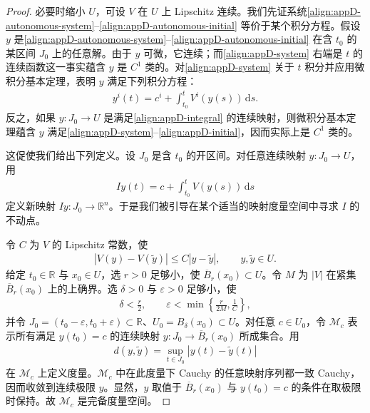 \documentclass[../../main.tex]{subfiles}
\begin{document}
\begin{proof}
必要时缩小 $U$，可设 $V$ 在 $U$ 上 Lipschitz 连续。我们先证系统\eqref{align:appD-autonomous-system}--\eqref{align:appD-autonomous-initial} 等价于某个积分方程。假设 $y$ 是\eqref{align:appD-autonomous-system}--\eqref{align:appD-autonomous-initial} 在含 $t_0$ 的某区间 $J_0$ 上的任意解。由于 $y$ 可微，它连续；而\eqref{align:appD-system} 右端是 $t$ 的连续函数这一事实蕴含 $y$ 是 $C^1$ 类的。对\eqref{align:appD-system} 关于 $t$ 积分并应用微积分基本定理，表明 $y$ 满足下列积分方程：
\begin{align}\label{align:appD-integral}
y^i(t)=c^i+\int_{t_0}^t V^i(y(s))\,\mathrm{d}s.
\end{align}
反之，如果 $y:J_0\to U$ 是满足\eqref{align:appD-integral} 的连续映射，则微积分基本定理蕴含 $y$ 满足\eqref{align:appD-system}--\eqref{align:appD-initial}，因而实际上是 $C^1$ 类的。

这促使我们给出下列定义。设 $J_0$ 是含 $t_0$ 的开区间。对任意连续映射 $y:J_0\to U$，用
\begin{align}\label{align:appD-integral-operator}
Iy(t)=c+\int_{t_0}^t V(y(s))\,\mathrm{d}s
\end{align}
定义新映射 $Iy:J_0\to\mathbb R^n$。于是我们被引导在某个适当的映射度量空间中寻求 $I$ 的不动点。

令 $C$ 为 $V$ 的 Lipschitz 常数，使
\begin{align}\label{align:appD-lipschitz-constant}
|V(y)-V(\widetilde y)|\leqslant C|y-\widetilde y|,\qquad y,\widetilde y\in U.
\end{align}
给定 $t_0\in\mathbb R$ 与 $x_0\in U$，选 $r>0$ 足够小，使 $\overline B_r(x_0)\subset U$。令 $M$ 为 $|V|$ 在紧集 $\overline B_r(x_0)$ 上的上确界。选 $\delta>0$ 与 $\varepsilon>0$ 足够小，使
\begin{align*}
\delta<\frac r2,\qquad \varepsilon<\min\left\{\frac{r}{2M},\frac1C\right\},
\end{align*}
并令 $J_0=(t_0-\varepsilon,t_0+\varepsilon)\subset\mathbb R$、$U_0=B_\delta(x_0)\subset U$。对任意 $c\in U_0$，令 $\mathcal M_c$ 表示所有满足 $y(t_0)=c$ 的连续映射 $y:J_0\to\overline B_r(x_0)$ 所成集合。用
\begin{align*}
d(y,\widetilde y)=\sup_{t\in J_0}|y(t)-\widetilde y(t)|
\end{align*}
在 $\mathcal M_c$ 上定义度量。$\mathcal M_c$ 中在此度量下 Cauchy 的任意映射序列都一致 Cauchy，因而收敛到连续极限 $y$。显然，$y$ 取值于 $\overline B_r(x_0)$ 与 $y(t_0)=c$ 的条件在取极限时保持。故 $\mathcal M_c$ 是完备度量空间。


\end{proof}
\end{document}
